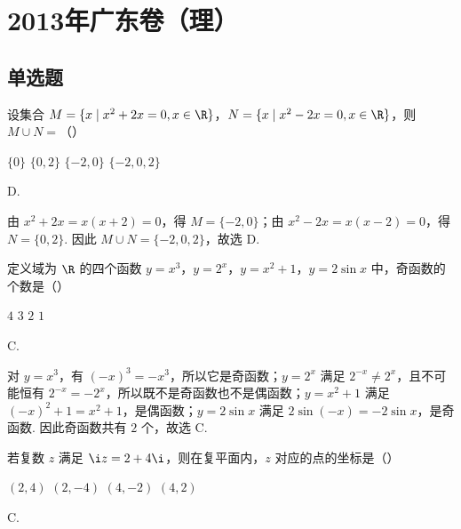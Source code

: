 \chapter{2013年广东卷（理）}

\section{单选题}

\begin{problem}
设集合 \(M = \{x \mid x^2 + 2x = 0, x \in \R\}\)，\(N = \{x \mid x^2 - 2x = 0, x \in \R\}\)，则 \(M \cup N =\)（\quad）

\choices
    {\( \{0\} \)}
    {\( \{0, 2\} \)}
    {\(\{-2, 0\}\)}
    {\(\{-2, 0, 2\}\)}
\end{problem}

\begin{answer}
D.
\end{answer}

\begin{solution}
由 \(x^2+2x=x(x+2)=0\)，得 \(M=\{-2,0\}\)；由 \(x^2-2x=x(x-2)=0\)，得 \(N=\{0,2\}\). 因此 \(M\cup N=\{-2,0,2\}\)，故选 D.
\end{solution}

\begin{problem}
定义域为 \(\R\) 的四个函数 \(y = x^3\)，\(y = 2^x\)，\(y = x^2 + 1\)，\(y = 2\sin x\) 中，奇函数的个数是（\quad）

\choices
    {\(4\)}
    {\(3\)}
    {\(2\)}
    {\(1\)}
\end{problem}

\begin{answer}
C.
\end{answer}

\begin{solution}
对 \(y=x^3\)，有 \((-x)^3=-x^3\)，所以它是奇函数；\(y=2^x\) 满足 \(2^{-x}\neq 2^x\)，且不可能恒有 \(2^{-x}=-2^x\)，所以既不是奇函数也不是偶函数；\(y=x^2+1\) 满足 \((-x)^2+1=x^2+1\)，是偶函数；\(y=2\sin x\) 满足 \(2\sin(-x)=-2\sin x\)，是奇函数. 因此奇函数共有 \(2\) 个，故选 C.
\end{solution}

\begin{problem}
若复数 \(z\) 满足 \(\i z = 2 + 4\i\)，则在复平面内，\(z\) 对应的点的坐标是（\quad）

\choices
    {\((2,4)\)}
    {\((2,-4)\)}
    {\((4,-2)\)}
    {\((4,2)\)}
\end{problem}

\begin{answer}
C.
\end{answer}

